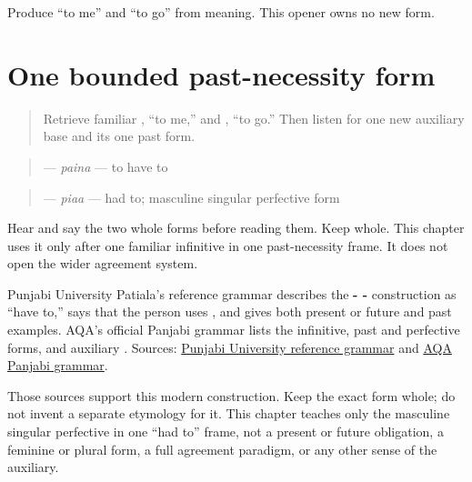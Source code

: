 \begin{tcolorbox}[breakable,colback=teal!4,colframe=teal!35!black,title={Before you move on}]
Produce “to me” and “to go” from meaning. This opener owns no new form.
\end{tcolorbox}
\section[\texorpdfstring{\pa{ਪੈਣਾ} · \pa{ਪਿਆ} (paina · piaa)}{ਪੈਣਾ · ਪਿਆ (paina · piaa)}]{One bounded past-necessity form}

\label{lesson:PA-C208-pia}



\begin{quote}
Retrieve familiar \textbf{}, “to me,” and \textbf{}, “to go.” Then listen for one new auxiliary base and its one past form.
\end{quote}

\begin{grammarlens}[title={Grammar Lens: direct owner}]
\begin{quote}
\textbf{} — \emph{paina} — to have to
\end{quote}

\begin{quote}
\textbf{} — \emph{piaa} — had to; masculine singular perfective form
\end{quote}

Hear and say the two whole forms before reading them. Keep \textbf{} whole. This chapter uses it only after one familiar infinitive in one past-necessity frame. It does not open the wider agreement system.
\end{grammarlens}

\begin{cousinweb}
Punjabi University Patiala's reference grammar describes the \textbf{- -} construction as “have to,” says that the person uses \textbf{}, and gives both present or future and past examples. AQA's official Panjabi grammar lists the infinitive, past and perfective forms, and auxiliary \textbf{}. Sources: \href{https://pt.learnpunjabi.org/assets/A\%20Reference\%20Grammar\_Final.pdf}{Punjabi University reference grammar} and \href{https://www.aqa.org.uk/subjects/panjabi/a-level/panjabi-7682/specification/subject-content/grammar}{AQA Panjabi grammar}.

Those sources support this modern construction. Keep the exact form whole; do not invent a separate etymology for it. This chapter teaches only the masculine singular perfective in one “had to” frame, not a present or future obligation, a feminine or plural form, a full agreement paradigm, or any other sense of the auxiliary.
\end{cousinweb}

